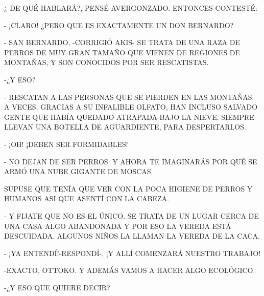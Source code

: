 ¿ DE QUÉ HABLARÁ?, PENSÉ AVERGONZADO. ENTONCES CONTESTÉ:

- ¡CLARO! ¿PERO QUE ES EXACTAMENTE UN DON BERNARDO?

- SAN BERNARDO, -CORRIGIÓ AKIS- SE TRATA DE UNA RAZA DE PERROS DE MUY GRAN TAMAÑO QUE VIENEN DE REGIONES DE MONTAÑAS, Y SON CONOCIDOS POR SER RESCATISTAS.

-¿Y ESO?


\newpage
{}	
\newpage
{}	
- RESCATAN A LAS PERSONAS QUE SE PIERDEN EN LAS MONTAÑAS. A VECES, GRACIAS A SU INFALIBLE OLFATO, HAN INCLUSO SALVADO GENTE QUE HABÍA QUEDADO ATRAPADA BAJO LA NIEVE. SIEMPRE LLEVAN UNA BOTELLA DE AGUARDIENTE, PARA DESPERTARLOS.

- ¡OH! ¡DEBEN SER FORMIDABLES!

- NO DEJAN DE SER PERROS. Y AHORA TE IMAGINARÁS POR QUÉ SE ARMÓ UNA NUBE GIGANTE DE MOSCAS.

SUPUSE QUE TENÍA QUE VER CON LA POCA HIGIENE DE PERROS Y HUMANOS ASI QUE ASENTÍ CON LA CABEZA.

- Y FIJATE QUE NO ES EL ÚNICO. SE TRATA DE UN LUGAR CERCA DE UNA CASA ALGO ABANDONADA Y POR ESO LA VEREDA ESTÁ DESCUIDADA. ALGUNOS NIÑOS LA LLAMAN LA VEREDA DE LA CACA.

\newpage
{}	
- ¡YA ENTENDÍ!-RESPONDÍ-, ¡Y ALLÍ COMENZARÁ NUESTRO TRABAJO!

-EXACTO, OTTOKO. Y ADEMÁS VAMOS A HACER ALGO ECOLÓGICO.

-¿Y ESO QUE QUIERE DECIR?


